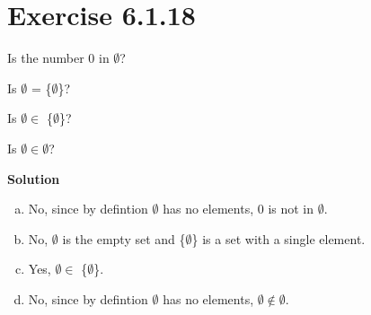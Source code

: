 \documentclass{article}
\newcommand{\enterProblemHeader}[1]{
    \nobreak\extramarks{}{Exercise {#1} continued on next page\ldots}\nobreak{}
    \nobreak\extramarks{Exercise {#1} (continued)}{Exercise {#1} continued on next page\ldots}\nobreak{}
}
\newcommand{\exitProblemHeader}[1]{
    \nobreak\extramarks{Exercise {#1} (continued)}{Exercise {#1} continued on next page\ldots}\nobreak{}
    \nobreak\extramarks{Exercise \arabic{#1}}{}\nobreak{}
}
\newenvironment{homeworkProblem}[1][-1]{
    \nobreak\extramarks{Page \thepage}{}\nobreak{}
    \section{Exercise {#1}}
}{
}
\begin{document}
\begin{homeworkProblem}[6.1.18]
    \begin{inparaenum}
        \item\label{q1a} Is the number 0 in $\emptyset$? ~~~
        \item\label{q1b} Is $\emptyset$ = \{$\emptyset$\}? ~~~
        \item\label{q1b} Is $\emptyset \in$ \{$\emptyset$\}? ~~~
        \item\label{q1b} Is $\emptyset \in \emptyset$? ~~~
    \end{inparaenum}\newline

    \textbf{Solution}

    \begin{enumerate}[a.]
        \item No, since by defintion $\emptyset$ has no elements, 0 is not
        in $\emptyset$.
        \item No, $\emptyset$ is the empty set and \{$\emptyset$\} is a set
        with a single element.
        \item Yes, $\emptyset \in$ \{$\emptyset$\}.
        \item No, since by defintion $\emptyset$ has no elements, $\emptyset \notin \emptyset$.
    \end{enumerate}
\end{homeworkProblem}

\pagebreak
\end{document}
